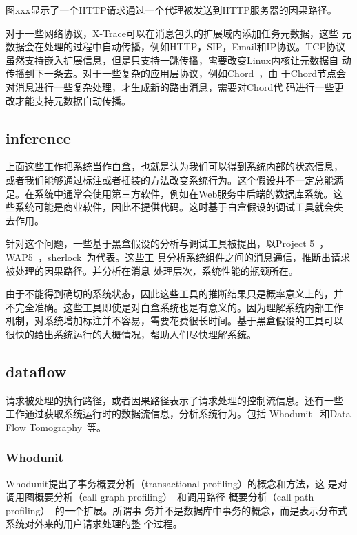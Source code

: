 图xxx显示了一个HTTP请求通过一个代理被发送到HTTP服务器的因果路径。

对于一些网络协议，X-Trace可以在消息包头的扩展域内添加任务元数据，这些
元数据会在处理的过程中自动传播，例如HTTP，SIP，Email和IP协议。TCP协议
虽然支持嵌入扩展信息，但是只支持一跳传播，需要改变Linux内核让元数据自
动传播到下一条去。对于一些复杂的应用层协议，例如Chord~\cite{chord}，由
于Chord节点会对消息进行一些复杂处理，才生成新的路由消息，需要对Chord代
码进行一些更改才能支持元数据自动传播。

\subsection{inference}

上面这些工作把系统当作白盒，也就是认为我们可以得到系统内部的状态信息，
或者我们能够通过标注或者插装的方法改变系统行为。这个假设并不一定总能满
足。在系统中通常会使用第三方软件，例如在Web服务中后端的数据库系统。这
些系统可能是商业软件，因此不提供代码。这时基于白盒假设的调试工具就会失
去作用。

针对这个问题，一些基于黑盒假设的分析与调试工具被提出，以Project
5~\cite{p5}，WAP5~\cite{wap5}，sherlock~\cite{sherlock}为代表。这些工
具分析系统组件之间的消息通信，推断出请求被处理的因果路径。并分析在消息
处理层次，系统性能的瓶颈所在。

由于不能得到确切的系统状态，因此这些工具的推断结果只是概率意义上的，并
不完全准确。这些工具即使是对白盒系统也是有意义的。因为理解系统内部工作
机制，对系统增加标注并不容易，需要花费很长时间。基于黑盒假设的工具可以
很快的给出系统运行的大概情况，帮助人们尽快理解系统。

\subsection{dataflow}

请求被处理的执行路径，或者因果路径表示了请求处理的控制流信息。还有一些
工作通过获取系统运行时的数据流信息，分析系统行为。包括
Whodunit~\cite{whodunit} 和Data Flow Tomography~\cite{dft}等。

\subsubsection*{Whodunit}

Whodunit提出了事务概要分析（transactional profiling）的概念和方法，这
是对调用图概要分析（call graph profiling）~\cite{whodunit13}和调用路径
概要分析（call path profiling）~\cite{whodunit14,15}的一个扩展。所谓事
务并不是数据库中事务的概念，而是表示分布式系统对外来的用户请求处理的整
个过程。

